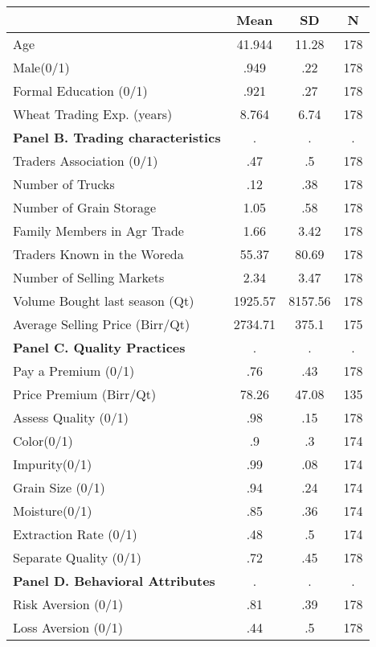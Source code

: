 {
\def\sym#1{\ifmmode^{#1}\else\(^{#1}\)\fi}
\begin{tabular*}{0.8\hsize}{@{\hskip\tabcolsep\extracolsep\fill}l*{3}{c}}
\toprule
                    &        Mean&          SD&           N\\
\midrule
Age                 &      41.944&       11.28&         178\\
Male(0/1)           &        .949&         .22&         178\\
Formal Education (0/1)&        .921&         .27&         178\\
Wheat Trading Exp. (years)&       8.764&        6.74&         178\\
\textbf{Panel B. Trading characteristics}&           .&           .&           .\\
Traders Association (0/1)&         .47&          .5&         178\\
Number of Trucks    &         .12&         .38&         178\\
Number of Grain Storage&        1.05&         .58&         178\\
Family Members in Agr Trade&        1.66&        3.42&         178\\
Traders Known in the Woreda &       55.37&       80.69&         178\\
Number of Selling Markets&        2.34&        3.47&         178\\
Volume Bought last season (Qt)&     1925.57&     8157.56&         178\\
Average Selling Price (Birr/Qt)&     2734.71&       375.1&         175\\
\textbf{Panel C. Quality Practices}&           .&           .&           .\\
Pay a Premium (0/1) &         .76&         .43&         178\\
Price Premium (Birr/Qt)&       78.26&       47.08&         135\\
Assess Quality (0/1)&         .98&         .15&         178\\
Color(0/1)          &          .9&          .3&         174\\
Impurity(0/1)       &         .99&         .08&         174\\
Grain Size (0/1)    &         .94&         .24&         174\\
Moisture(0/1)       &         .85&         .36&         174\\
Extraction Rate (0/1)&         .48&          .5&         174\\
Separate Quality (0/1)&         .72&         .45&         178\\
\textbf{Panel D. Behavioral Attributes}&           .&           .&           .\\
Risk Aversion (0/1) &         .81&         .39&         178\\
Loss Aversion (0/1) &         .44&          .5&         178\\
\bottomrule
\end{tabular*}
}
